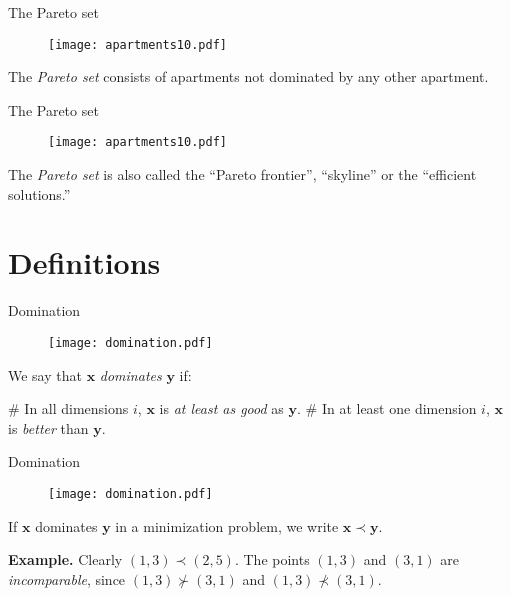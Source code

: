 \documentclass[11pt, aspectratio=149]{beamer}
\theoremstyle{plain}
\begin{document}
\begin{frame}[fragile, t]{The Pareto set}
	\begin{figure}
		\centering
		\texttt{[image: apartments10.pdf]}
	\end{figure}
	The \emph{Pareto set} consists of apartments not dominated by any other apartment.
\end{frame}

\begin{frame}[fragile, t]{The Pareto set}
	\begin{figure}
		\centering
		\texttt{[image: apartments10.pdf]}
	\end{figure}
	The \emph{Pareto set} is also called the ``Pareto frontier'', ``skyline'' or the ``efficient solutions.''
\end{frame}

\section{Definitions}

\begin{frame}[fragile, t]{Domination}
				\begin{figure}
					\centering
					\texttt{[image: domination.pdf]}
				\end{figure}
	We say that $\mathbf{x}$ \emph{dominates} $\mathbf{y}$ if:
	\begin{easylist}
		# In all dimensions $i$, $\mathbf{x}$ is \emph{at least as good} as $\mathbf{y}$.
		# In at least one dimension $i$, $\mathbf{x}$ is \emph{better} than $\mathbf{y}$.
	\end{easylist}
\end{frame}

\begin{frame}[fragile, t]{Domination}
	\begin{figure}
		\centering
		\texttt{[image: domination.pdf]}
	\end{figure}
	If $\mathbf{x}$ dominates $\mathbf{y}$ in a minimization problem, we write $\mathbf{x} \prec \mathbf{y}$.
	
	\textbf{Example.} Clearly $(1, 3) \prec (2, 5)$. The points $(1, 3)$ and $(3, 1)$ are \emph{incomparable}, since $(1, 3) \nsucc (3, 1)$ and $(1, 3) \nprec (3, 1)$.
\end{frame}
\end{document}
